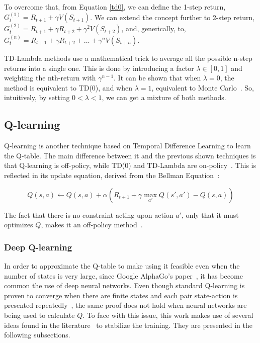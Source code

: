 \documentclass[11pt,twoside]{article}
\begin{document}
To overcome that, from Equation \ref{td0}, we can define the 1-step return, $G_t^{(1)} = R_{t+1} + \gamma V(S_{t+1})$. We can extend the concept further to 2-step return, $G_t^{(2)} = R_{t+1} + \gamma R_{t+2} + \gamma^2 V(S_{t+2})$, and, generically, to, $G_t^{(n)} = R_{t+1} + \gamma R_{t+2} + \ldots + \gamma^n V(S_{t+n})$. 

TD-Lambda methods use a mathematical trick to average all the possible n-step returns into a single one. This is done by introducing a factor $\lambda \in [0, 1]$ and weighting the nth-return with $\gamma^{n-1}$. It can be shown that when $\lambda = 0$, the method is equivalent to TD(0), and when $\lambda = 1$, equivalent to Monte Carlo~\cite{dp_approx}. So, intuitively, by setting $0 < \lambda < 1$, we can get a mixture of both methods.

\subsection{Q-learning}

Q-learning is another technique based on Temporal Difference Learning to learn the Q-table. The main difference between it and the previous shown techniques is that Q-learning is off-policy, while TD(0) and TD-Lambda are on-policy~\cite{sutton}. This is reflected in its update equation, derived from the Bellman Equation~\cite{qlearning}:

\begin{equation} \label{qlearning}
	Q(s, a) \leftarrow Q(s, a) + \alpha (R_{t+1} + \gamma \max_{a'} Q(s', a') - Q(s,a))
\end{equation}

The fact that there is no constraint acting upon action $a'$, only that it must optimizes $Q$, makes it an off-policy method~\cite{qlearning}.

\subsubsection{Deep Q-learning}

In order to approximate the Q-table to make using it feasible even when the number of states is very large, since Google AlphaGo's paper~\cite{alphago}, it has become common the use of deep neural networks. Even though standard Q-learning is proven to converge when there are finite states and each pair state-action is presented repeatedly~\cite{convergence_qlearning}, the same proof does not hold when neural networks are being used to calculate $Q$. To face with this issue, this work makes use of several ideas found in the literature~\cite{replay} to stabilize the training. They are presented in the following subsections.
\end{document}
